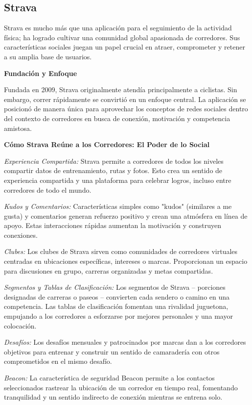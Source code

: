 \subsection{Strava}

Strava es mucho más que una aplicación para el seguimiento de la actividad física; ha logrado cultivar una comunidad global apasionada de corredores. Sus características sociales juegan un papel crucial en atraer, comprometer y retener a su amplia base de usuarios.

\textbf{Fundación y Enfoque}

Fundada en 2009, Strava originalmente atendía principalmente a ciclistas. Sin embargo, correr rápidamente se convirtió en un enfoque central. La aplicación se posicionó de manera única para aprovechar los conceptos de redes sociales dentro del contexto de corredores en busca de conexión, motivación y competencia amistosa.

\textbf{Cómo Strava Reúne a los Corredores: El Poder de lo Social}

\textit{Experiencia Compartida:} Strava permite a corredores de todos los niveles compartir datos de entrenamiento, rutas y fotos. Esto crea un sentido de experiencia compartida y una plataforma para celebrar logros, incluso entre corredores de todo el mundo.

\textit{Kudos y Comentarios:} Características simples como "kudos" (similares a me gusta) y comentarios generan refuerzo positivo y crean una atmósfera en línea de apoyo. Estas interacciones rápidas aumentan la motivación y construyen conexiones.

\textit{Clubes:} Los clubes de Strava sirven como comunidades de corredores virtuales centradas en ubicaciones específicas, intereses o marcas. Proporcionan un espacio para discusiones en grupo, carreras organizadas y metas compartidas.

\textit{Segmentos y Tablas de Clasificación:} Los segmentos de Strava – porciones designadas de carreras o paseos – convierten cada sendero o camino en una competencia. Las tablas de clasificación fomentan una rivalidad juguetona, empujando a los corredores a esforzarse por mejores personales y una mayor colocación.

\textit{Desafíos:} Los desafíos mensuales y patrocinados por marcas dan a los corredores objetivos para entrenar y construir un sentido de camaradería con otros comprometidos en el mismo desafío.

\textit{Beacon:} La característica de seguridad Beacon permite a los contactos seleccionados rastrear la ubicación de un corredor en tiempo real, fomentando tranquilidad y un sentido indirecto de conexión mientras se entrena solo.

